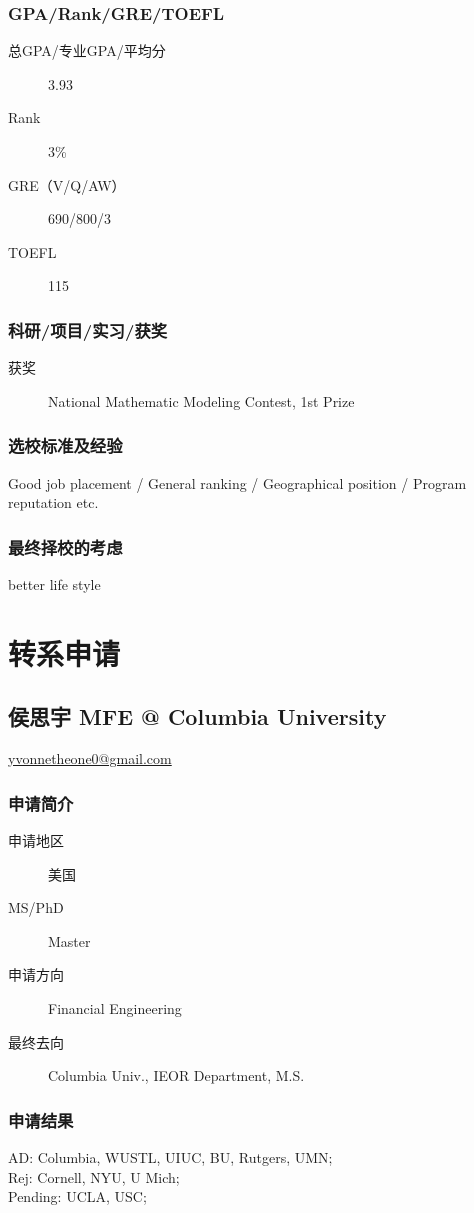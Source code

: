 \documentclass[11pt,fleqn,openany]{book} %
\begin{document}
\subsection*{GPA/Rank/GRE/TOEFL}
\begin{description}
\item[总GPA/专业GPA/平均分] 3.93
\item[Rank] 3\%
\item[GRE（V/Q/AW）] 690/800/3
\item[TOEFL] 115
\end{description}

\subsection*{科研/项目/实习/获奖}
\begin{description}
\item[获奖] National Mathematic Modeling Contest, 1st Prize
\end{description}
\subsection*{选校标准及经验}
Good job placement / General ranking / Geographical position / Program reputation etc.
\subsection*{最终择校的考虑}
better life style
\clearpage
\cleardoublepage
\chapter{转系申请}
\section{侯思宇 MFE @ Columbia University}
\hfill \href{mailto:yvonnetheone0@gmail.com}{yvonnetheone0@gmail.com}

\noindent\begin{minipage}[t]{0.45\textwidth}
\subsection*{申请简介}
\begin{description}
\item[申请地区] 美国
\item[MS/PhD] Master
\item[申请方向] Financial Engineering
\item[最终去向] Columbia Univ., IEOR Department, M.S.
\end{description}
\end{minipage}
\hfill
\begin{minipage}[t]{0.45\textwidth}
\subsection*{申请结果}
\noindent AD: Columbia, WUSTL, UIUC, BU, Rutgers, UMN;\\
Rej: Cornell, NYU, U Mich;\\
Pending: UCLA, USC;
\end{minipage}
\end{document}
